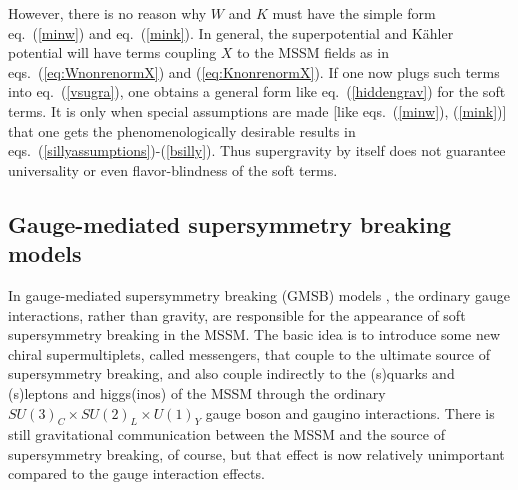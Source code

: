 \documentclass[11pt]{article}
\begin{document}
However, there is no  reason why $W$ and $K$ must have the 
simple form eq.~(\ref{minw}) and eq.~(\ref{mink}). In general, the 
superpotential and K\"ahler potential will have terms coupling $X$ to the MSSM 
fields as in eqs.~(\ref{eq:WnonrenormX}) and (\ref{eq:KnonrenormX}).
If one now plugs such terms into eq.~(\ref{vsugra}), one obtains a
general form like eq.~(\ref{hiddengrav}) for the soft terms. It is only
when special assumptions are made [like eqs.~(\ref{minw}), (\ref{mink})]
that one gets the phenomenologically desirable results in
eqs.~(\ref{sillyassumptions})-(\ref{bsilly}). Thus
supergravity by itself does not guarantee universality or 
even flavor-blindness of the soft
terms. 


\subsection{Gauge-mediated supersymmetry breaking
models}\label{subsec:origins.gmsb}
\setcounter{equation}{0}
\setcounter{footnote}{1}

In gauge-mediated supersymmetry breaking (GMSB) models
\cite{oldgmsb,newgmsb}, the ordinary gauge interactions, rather than
gravity, are responsible for the appearance of soft supersymmetry breaking
in the MSSM.  The basic idea is to introduce some new chiral
supermultiplets, called messengers, that couple to the ultimate source of
supersymmetry breaking, and also couple indirectly to the (s)quarks and
(s)leptons and higgs(inos) of the MSSM through the ordinary $SU(3)_C\times
SU(2)_L\times U(1)_Y$ gauge boson and gaugino interactions.  There is
still gravitational communication between the MSSM and the source of
supersymmetry breaking, of course, but that effect is now relatively
unimportant compared to the gauge interaction effects. 
\end{document}
